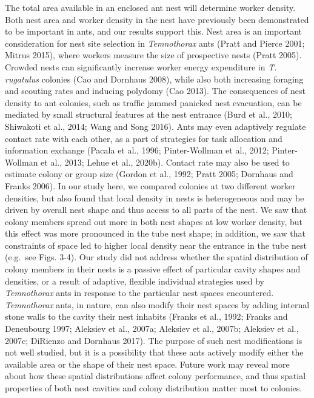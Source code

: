 \documentclass[3p]{elsarticle} %
\begin{document}
The total area available in an enclosed ant nest will determine worker
density. Both nest area and worker density in the nest have previously
been demonstrated to be important in ants, and our results support this.
Nest area is an important consideration for nest site selection in
\emph{Temnothorax} ants (Pratt and Pierce 2001; Mitrus 2015), where
workers measure the size of prospective nests (Pratt 2005). Crowded
nests can significantly increase worker energy expenditure in \emph{T.
rugatulus} colonies (Cao and Dornhaus 2008), while also both increasing
foraging and scouting rates and inducing polydomy (Cao 2013). The
consequences of nest density to ant colonies, such as traffic jammed
panicked nest evacuation, can be mediated by small structural features
at the nest entrance (Burd et al., 2010; Shiwakoti et al., 2014; Wang
and Song 2016). Ants may even adaptively regulate contact rate with each
other, as a part of strategies for task allocation and information
exchange (Pacala et al., 1996; Pinter-Wollman et al., 2012;
Pinter-Wollman et al., 2013; Lehue et al., 2020b). Contact rate may also
be used to estimate colony or group size (Gordon et al., 1992; Pratt
2005; Dornhaus and Franks 2006). In our study here, we compared colonies
at two different worker densities, but also found that local density in
nests is heterogeneous and may be driven by overall nest shape and thus
access to all parts of the nest. We saw that colony members spread out
more in both nest shapes at low worker density, but this effect was more
pronounced in the tube nest shape; in addition, we saw that constraints
of space led to higher local density near the entrance in the tube nest
(e.g.~see Figs. 3-4). Our study did not address whether the spatial
distribution of colony members in their nests is a passive effect of
particular cavity shapes and densities, or a result of adaptive,
flexible individual strategies used by \emph{Temnothorax} ants in
response to the particular nest spaces encountered. \emph{Temnothorax}
ants, in nature, can also modify their nest spaces by adding internal
stone walls to the cavity their nest inhabits (Franks et al., 1992;
Franks and Deneubourg 1997; Aleksiev et al., 2007a; Aleksiev et al.,
2007b; Aleksiev et al., 2007c; DiRienzo and Dornhaus 2017). The purpose
of such nest modifications is not well studied, but it is a possibility
that these ants actively modify either the available area or the shape
of their nest space. Future work may reveal more about how these spatial
distributions affect colony performance, and thus spatial properties of
both nest cavities and colony distribution matter most to colonies.
\end{document}
